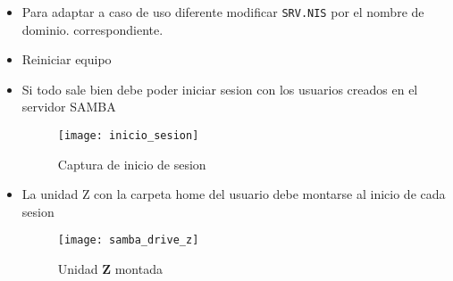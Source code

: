\documentclass[../main.tex]{subfiles}
\begin{document}
\begin{itemize}
  \item Para adaptar a caso de uso diferente
        modificar \texttt{SRV.NIS} por el nombre de dominio.
        correspondiente.
  \item Reiniciar equipo
        \newpage{}
  \item Si todo sale bien debe poder iniciar sesion con los
        usuarios creados en el servidor SAMBA
        \begin{figure}[H]
          \centering
          \texttt{[image: inicio\_sesion]}
          \caption{Captura de inicio de sesion}\label{fig:inicio_sesion}
        \end{figure}
        \newpage{}
  \item La unidad Z con la carpeta home del usuario debe montarse al
        inicio de cada sesion
        \begin{figure}[H]
          \centering
          \texttt{[image: samba\_drive\_z]}
          \caption{Unidad \textbf{Z} montada}\label{fig:samba_drive_z}
        \end{figure}

\end{itemize}
\end{document}

